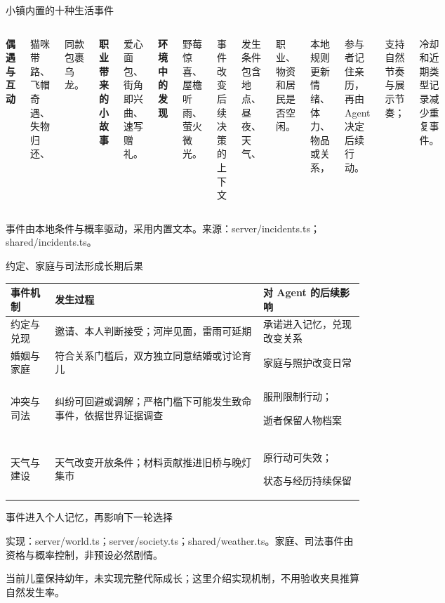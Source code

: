 \documentclass[aspectratio=169,10pt,fontset=fandol]{ctexbeamer}
\newcommand{\source}[1]{\vfill{\fontsize{6.3}{8}\selectfont\color{Muted}#1\par}}
\newcommand{\lead}[1]{{\large\color{Forest}#1}\par\medskip}
\newcommand{\key}[1]{\textbf{\color{Forest}#1}}
\newcommand{\point}[2]{\key{#1}\par{\small #2}\par\medskip}
\begin{document}
\begin{frame}{小镇内置的十种生活事件}
\begin{columns}[T,onlytextwidth]
\point{偶遇与互动}{猫咪带路、飞帽奇遇、失物归还、\par 同款包裹乌龙。}
\point{职业带来的小故事}{爱心面包、街角即兴曲、速写赠礼。}
\point{环境中的发现}{野莓惊喜、屋檐听雨、萤火微光。}
\lead{事件改变后续决策的上下文}
{\small 发生条件包含地点、昼夜、天气、\par 职业、物资和居民是否空闲。\par\medskip
本地规则更新情绪、体力、物品或关系，\par 参与者记住亲历，再由 Agent 决定后续行动。\par\medskip
支持自然节奏与展示节奏；\par 冷却和近期类型记录减少重复事件。}
\end{columns}
\source{事件由本地条件与概率驱动，采用内置文本。来源：server/incidents.ts；shared/incidents.ts。}
\end{frame}

\begin{frame}{约定、家庭与司法形成长期后果}
\relax
{\small\begin{tabularx}{\linewidth}{@{}p{2.2cm}Yp{4.2cm}@{}}\toprule
\key{事件机制} & \key{发生过程} & \key{对 Agent 的后续影响}\\\midrule
约定与兑现 & 邀请、本人判断接受；河岸见面，雷雨可延期 & 承诺进入记忆，兑现改变关系\\[1mm]
婚姻与家庭 & 符合关系门槛后，双方独立同意结婚或讨论育儿 & 家庭与照护改变日常\\[1mm]
冲突与司法 & 纠纷可回避或调解；严格门槛下可能发生致命事件，依据世界证据调查 & 服刑限制行动；\par 逝者保留人物档案\\[1mm]
天气与建设 & 天气改变开放条件；材料贡献推进旧桥与晚灯集市 & 原行动可失效；\par 状态与经历持续保留\\\bottomrule
\end{tabularx}}\par\medskip
\lead{事件进入个人记忆，再影响下一轮选择}
\source{实现：server/world.ts；server/society.ts；shared/weather.ts。家庭、司法事件由资格与概率控制，非预设必然剧情。\par 当前儿童保持幼年，未实现完整代际成长；这里介绍实现机制，不用验收夹具推算自然发生率。}
\end{frame}
\end{document}
